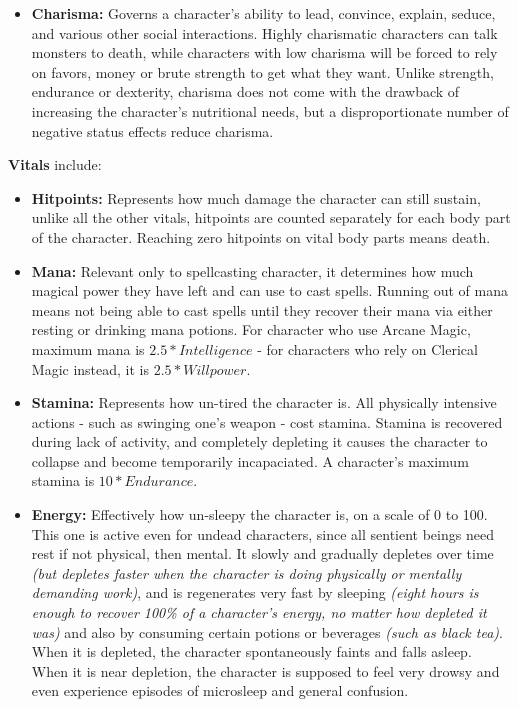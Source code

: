\begin{itemize}
\item \textbf{Charisma:} Governs a character's ability to lead, convince, explain, seduce, and various other social interactions. Highly charismatic characters can talk monsters to death, while characters with low charisma will be forced to rely on favors, money or brute strength to get what they want. Unlike strength, endurance or dexterity, charisma does not come with the drawback of increasing the character's nutritional needs, but a disproportionate number of negative status effects reduce charisma.
\end{itemize}
\textbf{Vitals} include:
\begin{itemize}
\item \textbf{Hitpoints:} Represents how much damage the character can still sustain, unlike all the other vitals, hitpoints are counted separately for each body part of the character. Reaching zero hitpoints on vital body parts means death.
\item \textbf{Mana:} Relevant only to spellcasting character, it determines how much magical power they have left and can use to cast spells. Running out of mana means not being able to cast spells until they recover their mana via either resting or drinking mana potions. For character who use Arcane Magic, maximum mana is $2.5*Intelligence$ - for characters who rely on Clerical Magic instead, it is  $2.5*Willpower$.
\item \textbf{Stamina:} Represents how un-tired the character is. All physically intensive actions - such as swinging one's weapon - cost stamina. Stamina is recovered during lack of activity, and completely depleting it causes the character to collapse and become temporarily incapaciated. A character's maximum stamina is $10*Endurance$.
\item \textbf{Energy:} Effectively how un-sleepy the character is, on a scale of 0 to 100. This one is active even for undead characters, since all sentient beings need rest \textemdash if not physical, then mental. It slowly and gradually depletes over time \textit{(but depletes faster when the character is doing physically or mentally demanding work)}, and is regenerates very fast by sleeping \textit{(eight hours is enough to recover 100\% of a character's energy, no matter how depleted it was)} and also by consuming certain potions or beverages  \textit{(such as black tea)}. When it is depleted, the character spontaneously faints and falls asleep. When it is near depletion, the character is supposed to feel very drowsy and even experience episodes of microsleep and general confusion.

\end{itemize}
